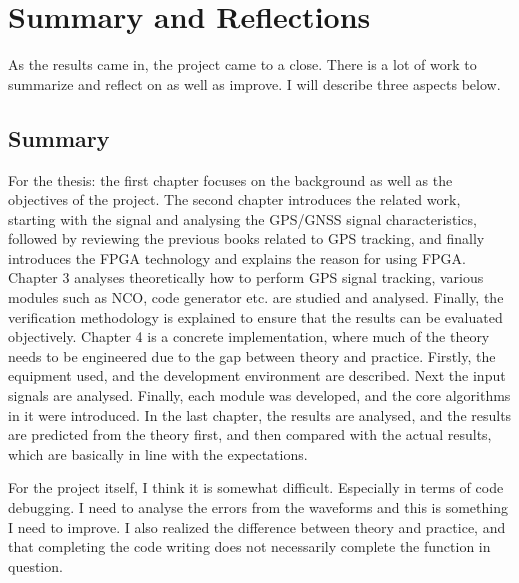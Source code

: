 \myClearDoublePage
\chapter{Summary and Reflections}
As the results came in, the project came to a close. There is a lot of work to summarize and reflect on as well as improve. I will describe three aspects below.

\section{Summary}
For the thesis: the first chapter focuses on the background as well as the objectives of the project. The second chapter introduces the related work, starting with the signal and analysing the GPS/GNSS signal characteristics, followed by reviewing the previous books related to GPS tracking, and finally introduces the FPGA technology and explains the reason for using FPGA. Chapter 3 analyses theoretically how to perform GPS signal tracking, various modules such as NCO, code generator etc. are studied and analysed. Finally, the verification methodology is explained to ensure that the results can be evaluated objectively. Chapter 4 is a concrete implementation, where much of the theory needs to be engineered due to the gap between theory and practice. Firstly, the equipment used, and the development environment are described. Next the input signals are analysed. Finally, each module was developed, and the core algorithms in it were introduced. In the last chapter, the results are analysed, and the results are predicted from the theory first, and then compared with the actual results, which are basically in line with the expectations.

For the project itself, I think it is somewhat difficult. Especially in terms of code debugging. I need to analyse the errors from the waveforms and this is something I need to improve. I also realized the difference between theory and practice, and that completing the code writing does not necessarily complete the function in question.

